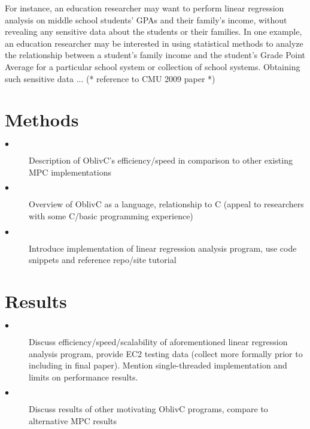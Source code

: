\documentclass{article}
\begin{document}

For instance, an education researcher may want to perform linear regression analysis on middle school students' GPAs and their family's income, without revealing any sensitive data about the students or their families. 
In one example, an education researcher may be interested in using statistical methods to analyze the relationship between a student's family income and the student's Grade Point Average for a particular school system or collection of school systems. Obtaining such sensitive data ... (* reference to CMU 2009 paper *)





\section{Methods}
\begin{description}
\item[$\bullet$] Description of OblivC’s efficiency/speed in comparison to other existing MPC implementations
\item[$\bullet$] Overview of OblivC as a language, relationship to C (appeal to researchers with some C/basic programming experience) 
\item[$\bullet$] Introduce implementation of linear regression analysis program, use code snippets and reference repo/site tutorial
\end{description}
\section{Results}
\begin{description}
\item[$\bullet$] Discuss efficiency/speed/scalability of aforementioned linear regression analysis program, provide EC2 testing data (collect more formally prior to including in final paper). Mention single-threaded implementation and limits on performance results.
\item[$\bullet$] Discuss results of other motivating OblivC programs, compare to alternative MPC results
\end{description}
\end{document}

